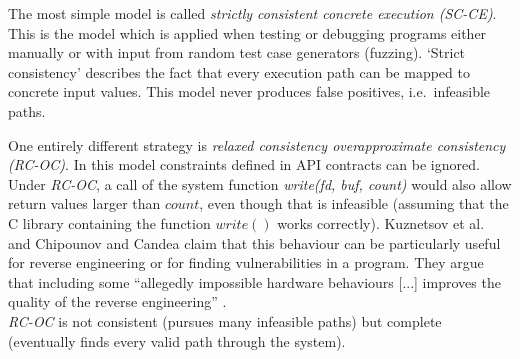 The most simple model is called \textit{strictly consistent concrete execution (SC-CE)}.
This is the model which is applied when testing or debugging programs either manually or with input from random test case generators (fuzzing).
`Strict consistency' describes the fact that every execution path can be mapped to concrete input values.
This model never produces false positives, i.e.~infeasible paths.


One entirely different strategy is \textit{relaxed consistency overapproximate consistency (RC-OC)}.
In this model constraints defined in API contracts can be ignored.
Under \textit{RC-OC}, a call of the system function \textit{write(fd, buf, count)} would also allow return values larger than $count$, even though that is infeasible (assuming that the C library containing the function $write()$ works correctly).
Kuznetsov et al.~\cite{kuznetsov2010testing} and Chipounov and Candea \cite{chipounov2010reverse} claim that this behaviour can be particularly useful for reverse engineering or for finding vulnerabilities in a program.
They argue that including some ``allegedly impossible hardware behaviours [...] improves the quality of the reverse engineering'' \cite[p. 11]{chip12s2e}.\\
\textit{RC-OC} is not consistent (pursues many infeasible paths) but complete (eventually finds every valid path through the system).


\iffalse
§2	Selective Symbolic Execution
		> Theorie-Teil
		> Was ist Symbolic Execution?
		> Was kann Selective Symbolic Execution besser?
			(Concrete -> symbolic transition usw.)
		> Konsistenzmodelle (wird hier evtl. schwierig, das richtige Maß 
			zu finden, um die Sache auf wenig Platz zu verstehen)
\fi
